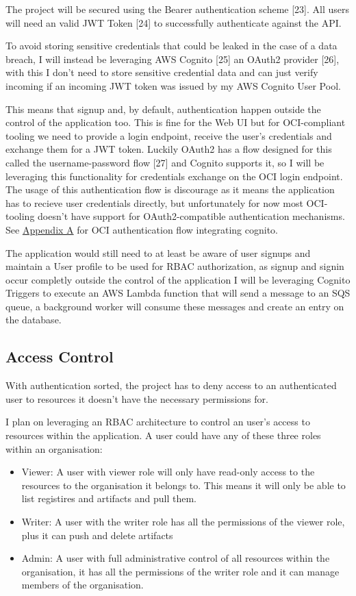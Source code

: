 \documentclass{article}
\begin{document}
  The project will be secured using the Bearer authentication scheme [23]. All users will need an valid JWT Token [24] to successfully authenticate against the API.

  To avoid storing sensitive credentials that could be leaked in the case of a data breach, I will instead be leveraging AWS Cognito [25] an OAuth2 provider [26], with this I don't need to store sensitive credential data and can just verify incoming if an incoming JWT token was issued by my AWS Cognito User Pool.

  This means that signup and, by default, authentication happen outside the control of the application too. This is fine for the Web UI but for OCI-compliant tooling we need to provide a login endpoint, receive the user's credentials and exchange them for a JWT token. Luckily OAuth2 has a flow designed for this called the username-password flow [27] and Cognito supports it, so I will be leveraging this functionality for credentials exchange on the OCI login endpoint. The usage of this authentication flow is discourage as it means the application has to recieve user credentials directly, but unfortunately for now most OCI-tooling doesn't have support for OAuth2-compatible authentication mechanisms. See \hyperref[sec:appendix-a]{Appendix A} for OCI authentication flow integrating cognito.

  The application would still need to at least be aware of user signups and maintain a User profile to be used for RBAC authorization, as signup and signin occur completly outside the control of the application I will be leveraging Cognito Triggers to execute an AWS Lambda function that will send a message to an SQS queue, a background worker will consume these messages and create an entry on the database.

  \subsection{Access Control}

  With authentication sorted, the project has to deny access to an authenticated user to resources it doesn't have the necessary permissions for.

  I plan on leveraging an RBAC architecture to control an user's access to resources within the application. A user could have any of these three roles within an organisation:
  \begin{itemize}
    \item Viewer: A user with viewer role will only have read-only access to the resources to the organisation it belongs to. This means it will only be able to list registires and artifacts and pull them.
    \item Writer: A user with the writer role has all the permissions of the viewer role, plus it can push and delete artifacts
    \item Admin: A user with full administrative control of all resources within the organisation, it has all the permissions of the writer role and it can manage members of the organisation.
  \end{itemize}
\end{document}
